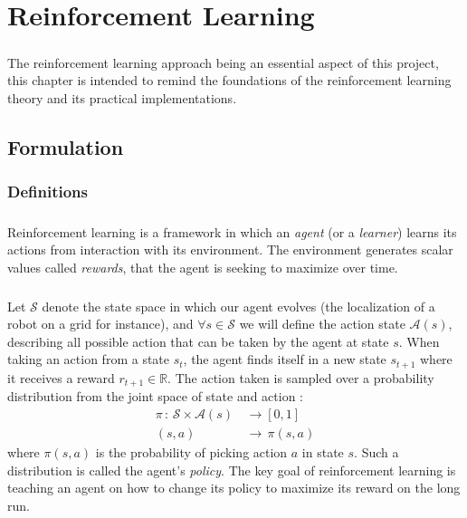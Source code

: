 \documentclass[a4paper]{report}
\begin{document}
	\chapter{Reinforcement Learning}
	{
		\paragraph{} The reinforcement learning approach being an essential aspect of this project, this chapter is intended to remind the foundations of the reinforcement learning theory and its practical implementations. 
		\section{Formulation}
		{
			\subsection{Definitions}
			{
				\paragraph{} Reinforcement learning is a framework in which an \emph{agent} (or a \emph{learner}) learns its actions from interaction with its environment. The environment generates scalar values called \emph{rewards}, that the agent is seeking to maximize over time. 
			
				\paragraph{} Let $\mathcal{S}$ denote the state space in which our agent evolves (the localization of a robot on a grid for instance), and $\forall{s}\in\mathcal{S}$ we will define the action state $\mathcal{A}(s)$, describing all possible action that can be taken by the agent at state $s$. When taking an action from a state $s_t$, the agent finds itself in a new state $s_{t+1}$ where it receives a reward $r_{t+1}\in\mathbb{R}$. The action taken is sampled over a probability distribution from the joint space of state and action : 
				\begin{equation}
					\begin{aligned}
						\pi \, : \, \mathcal{S}\times\mathcal{A}(s) \, &\to [0,1]\\
							 (s,a) \, &\to \,  \pi(s,a)
					\end{aligned}
				\end{equation}	
				where $\pi(s,a)$ is the probability of picking action $a$ in state $s$. Such a distribution is called the agent's \emph{policy}. The key goal of reinforcement learning is teaching an agent on how to change its policy to maximize its reward on the long run. 
				
}}}
\end{document}
